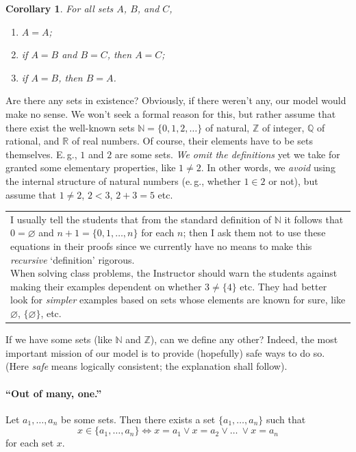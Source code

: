 \documentclass[12pt,notitlepage]{article}
\theoremstyle{plain}
\newtheorem{corr}[thm]{Corollary}
\theoremstyle{definition}
\theoremstyle{plain}
\newcommand{\N}{\mathbb{N}}
\newcommand{\Z}{\mathbb{Z}}
\newcommand{\Q}{\mathbb{Q}}
\newcommand{\R}{\mathbb{R}}
\newcommand{\void}{\varnothing}
\newcommand{\1}{\mathbf{1}}
\newcommand{\0}{\mathbf{0}}
\newcommand{\mcomm}[1]{
\medskip\noindent\begin{tabular}{| l}
\parbox{0.99\textwidth}{{\small
#1 }}\end{tabular}
\smallskip}
\begin{document}
\begin{corr}\label{ch0:id}
For all sets $A$, $B$, and $C$,
\begin{enumerate}
\item $A = A$;
\item if $A = B$ and $B = C$, then $A = C$;
\item if $A = B$, then $B = A$.
\end{enumerate}
\end{corr}

Are there any sets in existence? Obviously, if there weren't any, our model would make no sense. We won't seek a formal reason for this, but rather assume that there exist the well-known sets $\N = \{0,1,2,\ldots \}$ of natural, $\Z$ of integer, $\Q$ of rational, and $\R$ of real numbers. Of course, their elements have to be sets themselves. E.\,g., $1$ and $2$ are some sets. \emph{We omit the definitions} yet we take for granted some elementary properties, like $1 \neq 2$. In other words, we \emph{avoid} using the internal structure of natural numbers (e.\,g., whether $1 \in 2$ or not), but assume that $1 \neq 2$, $2 < 3$, $2 + 3 = 5$ etc.

\mcomm{I usually tell the students that from the standard definition of $\N$ it follows that $0 = \void$ and $n + 1 = \{0,1,\ldots,n\}$ for each $n$; then I ask them not to use these equations in their proofs since we currently have no means to make this \emph{recursive} `definition' rigorous. 
\medskip\\
When solving class problems, the Instructor should warn the students against making their examples dependent on whether $3 \neq \{ 4 \}$ etc. They had better look for \emph{simpler} examples based on sets whose elements are known for sure, like $\void$, $\{ \void \}$, etc.}

If we have some sets (like $\N$ and $\Z$), can we define any other? Indeed, the most important mission of our model is to provide (hopefully) safe ways to do so. (Here \emph{safe} means logically consistent; the explanation shall follow).

\paragraph{``Out of many, one.''} Let $a_1,\ldots,a_n$ be some sets. Then there exists a set $\{a_1,\ldots,a_n \}$ such that
$$x \in \{a_1,\ldots,a_n\} \iff x = a_1 \vee x = a_2 \vee \ldots\ \vee x = a_n$$
for each set $x$.
\end{document}
